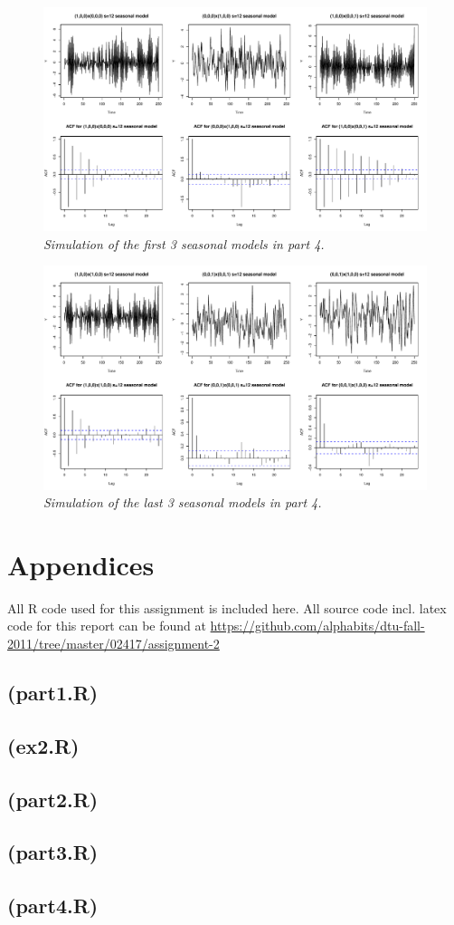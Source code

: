 \begin{figure}
    \centering
    \includegraphics[width=140mm]{seasonalmodels-1.pdf}
    \caption{\textit{Simulation of the first 3 seasonal models in part 4.}}
    \label{fig:p4-1}
\end{figure}
\begin{figure}
    \centering
    \includegraphics[width=140mm]{seasonalmodels-2.pdf}
    \caption{\textit{Simulation of the last 3 seasonal models in part 4.}}
    \label{fig:p4-2}
\end{figure}

\pagebreak
\section*{Appendices}
All R code used for this assignment is included here. All source code incl. latex code for this report can be found at {\small\url{https://github.com/alphabits/dtu-fall-2011/tree/master/02417/assignment-2}}
\subsection*{(part1.R)}

\subsection*{(ex2.R)}

\pagebreak
\subsection*{(part2.R)}

\subsection*{(part3.R)}

\subsection*{(part4.R)}



\pagebreak





